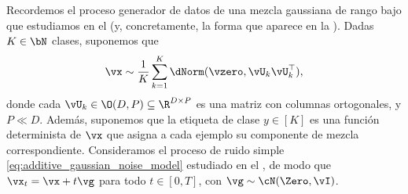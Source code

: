 \documentclass[../../book-main_es.tex]{subfiles}
\begin{document}
\begin{example}\label{example:denoising-gaussian-mixture-cfg}
    Recordemos el proceso generador de datos de una mezcla gaussiana de rango bajo
    que estudiamos en el
     (y, concretamente, la forma que aparece en la
    ). Dadas $K \in \bN$ clases, suponemos que
    \begin{equation}\label{eq:MoG1-ch6}
        \vx \sim \frac{1}{K}\sum_{k = 1}^{K}\dNorm(\vzero,
        \vU_{k}\vU_{k}^{\top}),
    \end{equation}
    donde cada \(\vU_{k} \in \O(D, P) \subseteq \R^{D \times P}\) es
    una matriz con
    columnas ortogonales, y $P \ll D$.
    Además, suponemos que la etiqueta de clase $y \in [K]$ es una función determinista
    de $\vx$ que asigna a cada ejemplo su componente de mezcla correspondiente.
    Consideramos el proceso de ruido simple
    \eqref{eq:additive_gaussian_noise_model} estudiado en el , de modo que
    $\vx_t = \vx + t \vg$ para todo $t \in [0, T]$, con $\vg \sim \cN(\Zero,
    \vI)$.


\end{example}
\end{document}
